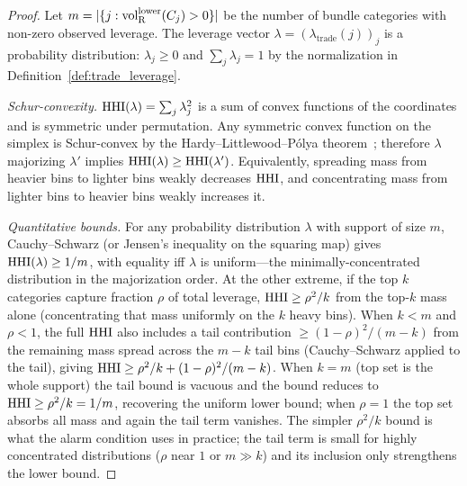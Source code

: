 \begin{proof}
Let $m = |\{j : {\operatorname{vol}_{\mathrm{R}}^{\mathrm{lower}}}(C_j) > 0\}|$ be the number of bundle
categories with non-zero observed leverage.  The leverage vector
$\lambda = (\lambda_{\mathrm{trade}}(j))_j$ is a probability
distribution: $\lambda_j \geq 0$ and $\sum_j \lambda_j = 1$ by
the normalization in Definition~\ref{def:trade_leverage}.

\emph{Schur-convexity.}
$\mathrm{HHI}(\lambda) = \sum_j \lambda_j^2$ is a sum of convex functions
of the coordinates and is symmetric under permutation.  Any
symmetric convex function on the simplex is Schur-convex by the
Hardy--Littlewood--P\'olya
theorem~\citep{hardy1929majorization,marshall2011inequalities};
therefore $\lambda$ majorizing $\lambda'$ implies $\mathrm{HHI}(\lambda)
\geq \mathrm{HHI}(\lambda')$.  Equivalently, spreading mass from heavier
bins to lighter bins weakly decreases $\mathrm{HHI}$, and concentrating
mass from lighter bins to heavier bins weakly increases it.

\emph{Quantitative bounds.}
For any probability distribution $\lambda$ with support of size
$m$, Cauchy--Schwarz (or Jensen's inequality on the squaring
map) gives $\mathrm{HHI}(\lambda) \geq 1/m$, with equality iff $\lambda$
is uniform---the minimally-concentrated distribution in the
majorization order.  At the other extreme, if the top $k$
categories capture fraction $\rho$ of total leverage,
$\mathrm{HHI} \geq \rho^2/k$ from the top-$k$ mass alone (concentrating
that mass uniformly on the $k$ heavy bins).  When $k < m$ and
$\rho < 1$, the full $\mathrm{HHI}$ also includes a tail contribution
$\geq (1-\rho)^2/(m-k)$ from the remaining mass spread across
the $m-k$ tail bins (Cauchy--Schwarz applied to the tail),
giving $\mathrm{HHI} \geq \rho^2/k + (1-\rho)^2/(m-k)$.  When $k = m$
(top set is the whole support) the tail bound is vacuous and
the bound reduces to $\mathrm{HHI} \geq \rho^2/k = 1/m$, recovering the
uniform lower bound; when $\rho = 1$ the top set absorbs all
mass and again the tail term vanishes.  The simpler $\rho^2/k$ bound is what the alarm
condition uses in practice; the tail term is small for highly
concentrated distributions ($\rho$ near $1$ or $m \gg k$) and
its inclusion only strengthens the lower bound.


\end{proof}
